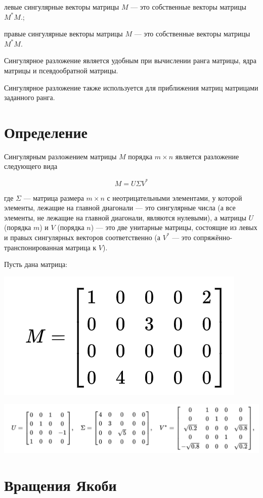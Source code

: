 \documentclass[pdf, unicode, 12pt, a4paper,oneside,fleqn]{article}
\begin{document}
левые сингулярные векторы матрицы $M$ — это собственные векторы матрицы  $M^*M.$;

правые сингулярные векторы матрицы $M$ — это собственные векторы матрицы $M^*M.$

Сингулярное разложение является удобным при вычислении ранга матрицы, ядра матрицы и псевдообратной матрицы.

Сингулярное разложение также используется для приближения матриц матрицами заданного ранга.

\section{Определение}

Сингулярным разложением матрицы $M$ порядка  $m \times n$ является разложение следующего вида

$$
M = U \Sigma V^{*}
$$

где $\Sigma$  — матрица размера $m \times n$ с неотрицательными элементами, у которой элементы, лежащие на главной диагонали — это сингулярные числа (а все элементы, не лежащие на главной диагонали, являются нулевыми), а матрицы $U$ (порядка $m$) и $V$ (порядка $n$) — это две унитарные матрицы, состоящие из левых и правых сингулярных векторов соответственно (а $V^*$ — это сопряжённо-транспонированная матрица к $V$).

Пусть дана матрица:

\includegraphics[scale=0.4]{data1.png}

\includegraphics[scale=0.35]{data2.png}

\section{Вращения Якоби}
\end{document}
